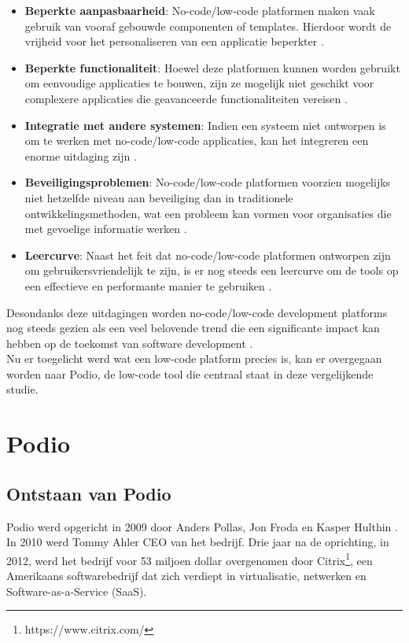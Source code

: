 \begin{itemize}
    \item \textbf{Beperkte aanpasbaarheid}: No-code/low-code platformen maken vaak gebruik van vooraf gebouwde componenten of templates. Hierdoor wordt de vrijheid voor het personaliseren van een applicatie beperkter \autocite{Yan2021}.
    \item \textbf{Beperkte functionaliteit}: Hoewel deze platformen kunnen worden gebruikt om eenvoudige applicaties te bouwen, zijn ze mogelijk niet geschikt voor complexere applicaties die geavanceerde functionaliteiten vereisen \autocite{Yan2021}.
    \item \textbf{Integratie met andere systemen}: Indien een systeem niet ontworpen is om te werken met no-code/low-code applicaties, kan het integreren een enorme uitdaging zijn \autocite{Ferreira2019}.
    \item \textbf{Beveiligingsproblemen}: No-code/low-code platformen voorzien mogelijks niet hetzelfde niveau aan beveiliging dan in traditionele ontwikkelingsmethoden, wat een probleem kan vormen voor organisaties die met gevoelige informatie werken \autocite{Ploder2019}.
    \item \textbf{Leercurve}: Naast het feit dat no-code/low-code platformen ontworpen zijn om gebruikersvriendelijk te zijn, is er nog steeds een leercurve om de tools op een effectieve en performante manier te gebruiken \autocite{Yan2021}.  
\end{itemize}

Desondanks deze uitdagingen worden no-code/low-code development platforms nog steeds gezien als een veel belovende trend die een significante impact kan hebben op de toekomst van software development \autocite{Yan2021}. \\

Nu er toegelicht werd wat een low-code platform precies is, kan er overgegaan worden naar Podio, de low-code tool die centraal staat in deze vergelijkende studie.

\section{Podio}
\label{sec:podio}

\subsection{Ontstaan van Podio}
\label{subsec:ontstaan_podio}

Podio werd opgericht in 2009 door Anders Pollas, Jon Froda en Kasper Hulthin \autocite{Crunchbase}. In 2010 werd Tommy Ahler CEO van het bedrijf. Drie jaar na de oprichting, in 2012, werd het bedrijf voor 53 miljoen dollar overgenomen door Citrix\footnote{https://www.citrix.com/}, een Amerikaans softwarebedrijf dat zich verdiept in virtualisatie, netwerken en Software-as-a-Service (SaaS). \\

